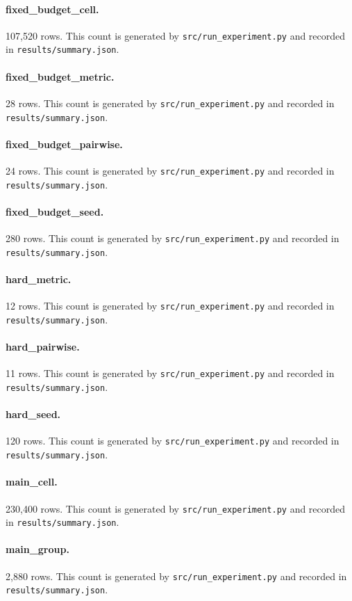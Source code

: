 \documentclass{article}
\begin{document}
\paragraph{fixed\_budget\_cell.} 107,520 rows. This count is generated by \texttt{src/run\_experiment.py} and recorded in \texttt{results/summary.json}.
\paragraph{fixed\_budget\_metric.} 28 rows. This count is generated by \texttt{src/run\_experiment.py} and recorded in \texttt{results/summary.json}.
\paragraph{fixed\_budget\_pairwise.} 24 rows. This count is generated by \texttt{src/run\_experiment.py} and recorded in \texttt{results/summary.json}.
\paragraph{fixed\_budget\_seed.} 280 rows. This count is generated by \texttt{src/run\_experiment.py} and recorded in \texttt{results/summary.json}.
\paragraph{hard\_metric.} 12 rows. This count is generated by \texttt{src/run\_experiment.py} and recorded in \texttt{results/summary.json}.
\paragraph{hard\_pairwise.} 11 rows. This count is generated by \texttt{src/run\_experiment.py} and recorded in \texttt{results/summary.json}.
\paragraph{hard\_seed.} 120 rows. This count is generated by \texttt{src/run\_experiment.py} and recorded in \texttt{results/summary.json}.
\paragraph{main\_cell.} 230,400 rows. This count is generated by \texttt{src/run\_experiment.py} and recorded in \texttt{results/summary.json}.
\paragraph{main\_group.} 2,880 rows. This count is generated by \texttt{src/run\_experiment.py} and recorded in \texttt{results/summary.json}.
\end{document}

